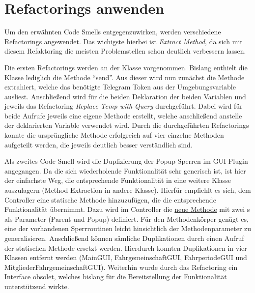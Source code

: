 \section{Refactorings anwenden}
Um den erwähnten Code Smells entgegenzuwirken, werden verschiedene Refactorings angewendet.
Das wichigste hierbei ist \emph{Extract Method}, da sich mit diesem Refaktoring die meisten Problemstellen schon deutlich verbessern lassen.

Die ersten Refactorings werden an der Klasse \href{https://github.com/yschiebelhut/carpool-java/blob/93eebf7f30e394dcf7abcb044328bf6dbaf1823e/0-carpool-java-integration/src/main/java/telegram/Telegram.java}{} vorgenommen.
Bislang enthielt die Klasse lediglich die Methode \enquote{send}.
Aus dieser wird nun zunächst die Methode  extrahiert, welche das benötigte Telegram Token aus der Umgebungsvariable ausliest.
Anschließend wird für die beiden Deklaration der beiden Variablen  und  jeweils das Refactoring \emph{Replace Temp with Query} durchgeführt.
Dabei wird für beide Aufrufe jeweils eine eigene Methode erstellt, welche anschließend anstelle der deklarierten Variable verwendet wird.
Durch die durchgeführten Refactorings konnte die ursprüngliche Methode erfolgreich auf vier einzelne Methoden aufgeteilt werden, die jeweils deutlich besser verständlich sind.

Als zweites Code Smell wird die Duplizierung der Popup-Sperren im GUI-Plugin angegangen.
Da die sich wiederholende Funktionalität sehr generisch ist, ist hier der einfachste Weg, die entsprechende Funktionalität in eine weitere Klasse auszulagern (Method Extraction in andere Klasse).
Hierfür empfiehlt es sich, dem Controller eine statische Methode hinzuzufügen, die die entsprechende Funktionalität übernimmt.
Dazu wird im Controller die \href{https://github.com/yschiebelhut/carpool-java/blob/93eebf7f30e394dcf7abcb044328bf6dbaf1823e/0-carpool-java-plugin-ui/src/main/java/gui/Controller.java#L32}{neue Methode} mit zwei s als Parameter (Parent und Popup) definiert.
Für den Methodenkörper genügt es, eine der vorhandenen Sperrroutinen leicht hinsichtlich der Methodenparameter zu generalisieren.
Anschließend können sämliche Duplikationen durch einen Aufruf der statischen Methode ersetzt werden.
Hierdurch konnten Duplikationen in vier Klassen entfernt werden (MainGUI, FahrgemeinschaftGUI, FahrperiodeGUI und MitgliederFahrgemeinschaftGUI).
Weiterhin wurde durch das Refactoring ein Interface obsolet, welches bislang für die Bereitstellung der Funktionalität unterstützend wirkte.


